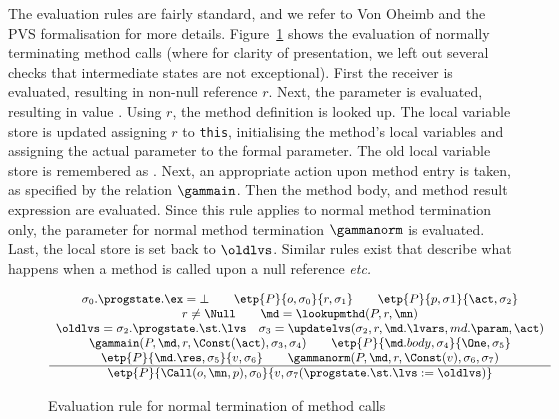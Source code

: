 The evaluation rules are fairly standard, and we refer to Von Oheimb
and the PVS formalisation for more details.  Figure~\ref{FigEvalRules}
shows the evaluation of normally terminating method calls (where for
clarity of presentation, we left out several checks that intermediate
states are not exceptional).  First the receiver is evaluated,
resulting in non-null reference \(r\).  Next, the parameter is
evaluated, resulting in value \act. Using \(r\), the method definition
\md is looked up.  The local variable store is updated assigning
\(r\) to \texttt{this}, initialising the method's local variables and
assigning the actual parameter to the formal parameter. The old local variable
store is remembered as \oldlvs.
Next, an appropriate action upon method entry is taken, as specified
by the relation \(\gammain\). Then the method body, and method result expression
are evaluated. Since this rule applies to normal method termination only,
the parameter for normal method termination \(\gammanorm\) is evaluated.
Last, the local store is set back to \(\oldlvs\). Similar rules exist that
describe what happens when a method is called upon a null reference \emph{etc.}


\begin{figure}[t]
\[{\small
\begin{array}{c}
\sigma_0.\progstate.\ex = \bot \qquad        %
\etp{P}{o, \sigma_0}{r,\sigma_1} \qquad      %
\etp{P}{p, \sigma1}{\act, \sigma_2}\\        %
r \not= \Null \qquad                         %
\md = \lookupmthd(P, r, \mn) \\
\oldlvs = \sigma_2.\progstate.\st.\lvs \quad
\sigma_3 = \updatelvs(\sigma_2, r, \md.\lvars, md.\param, \act) \\
\gammain(P, \md, r, \Const(\act), \sigma_3, \sigma_4) \qquad
\etp{P}{\md.body, \sigma_4}{\One,\sigma_5} \\
\etp{P}{\md.\res, \sigma_5}{v,\sigma_6}\qquad
\gammanorm(P, \md, r, \Const(v), \sigma_6, \sigma_7)\\
\hline
\etp{P}{\Call(o,\mn,p), \sigma_0}{v, \sigma_7
(\progstate.\st.\lvs := \oldlvs)}
\end{array}}
\]
\caption{Evaluation rule for normal termination of method
calls}\label{FigEvalRules}
\end{figure}


